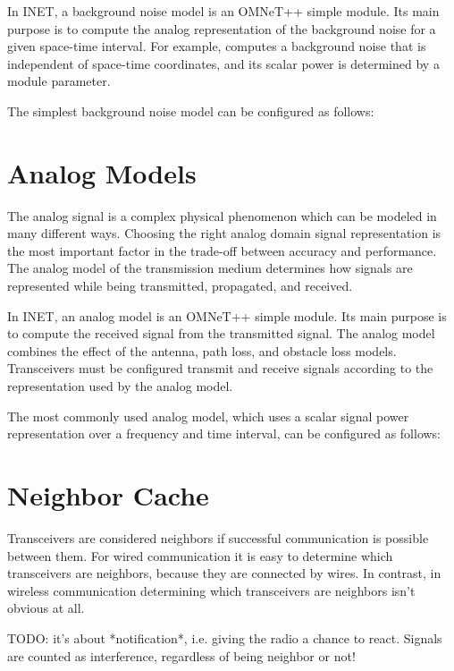 In INET, a background noise model is an OMNeT++ simple module. Its main
purpose is to compute the analog representation of the background noise for
a given space-time interval. For example,
 computes a background noise that is
independent of space-time coordinates, and its scalar power is determined
by a module parameter.

The simplest background noise model can be configured as follows:


\section{Analog Models}

The analog signal is a complex physical phenomenon which can be modeled in
many different ways. Choosing the right analog domain signal representation
is the most important factor in the trade-off between accuracy and
performance. The analog model of the transmission medium determines how
signals are represented while being transmitted, propagated, and received.

In INET, an analog model is an OMNeT++ simple module. Its main purpose is
to compute the received signal from the transmitted signal. The analog
model combines the effect of the antenna, path loss, and obstacle loss
models. Transceivers must be configured transmit and receive signals
according to the representation used by the analog model.

The most commonly used analog model, which uses a scalar signal power
representation over a frequency and time interval, can be configured as
follows:


\section{Neighbor Cache}

Transceivers are considered neighbors if successful communication is
possible between them. For wired communication it is easy to determine
which transceivers are neighbors, because they are connected by wires. In
contrast, in wireless communication determining which transceivers are
neighbors isn't obvious at all.

TODO: it's about *notification*, i.e. giving the radio a chance
to react. Signals are counted as interference, regardless of being neighbor or not!

